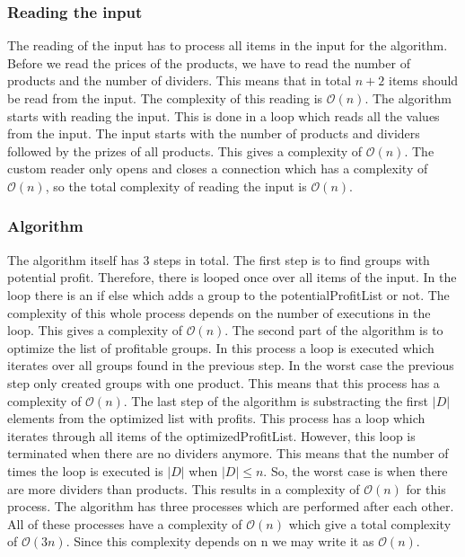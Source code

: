 \documentclass{article}
\newcommand{\bigO}[1]{\mathcal{O}(#1)}
\begin{document}
\subsubsection{Reading the input}
The reading of the input has to process all items in the input for the algorithm. Before we read the prices of the products, we have to read the number of products and the number of dividers. This means that in total $n + 2$ items should be read from the input. The complexity of this reading is $\bigO{n}$.
\newline
\newline
The algorithm starts with reading the input. This is done in a loop which reads all the values from the input. The input starts with the number of products and dividers followed by the prizes of all products. This gives a complexity of $\bigO{n}$. The custom reader only opens and closes a connection which has a complexity of $\bigO{n}$, so the total complexity of reading the input is $\bigO{n}$.

\subsubsection{Algorithm}
The algorithm itself has 3 steps in total. The first step is to find groups with potential profit. Therefore, there is looped once over all items of the input. In the loop there is an if else which adds a group to the potentialProfitList or not. The complexity of this whole process depends on the number of executions in the loop. This gives a complexity of $\bigO{n}$.
\newline
\newline
The second part of the algorithm is to optimize the list of profitable groups. In this process a loop is executed which iterates over all groups found in the previous step. In the worst case the previous step only created groups with one product. This means that this process has a complexity of $\bigO{n}$.
\newline
\newline
The last step of the algorithm is substracting the first $|D|$ elements from the optimized list with profits. This process has a loop which iterates through all items of the optimizedProfitList. However, this loop is terminated when there are no dividers anymore. This means that the number of times the loop is executed is $|D|$ when $|D| \leq n$. So, the worst case is when there are more dividers than products. This results in a complexity of $\bigO{n}$ for this process.
\newline
\newline
The algorithm has three processes which are performed after each other. All of these processes have a complexity of $\bigO{n}$ which give a total complexity of $\bigO{3n}$. Since this complexity depends on n we may write it as $\bigO{n}$.
\end{document}
